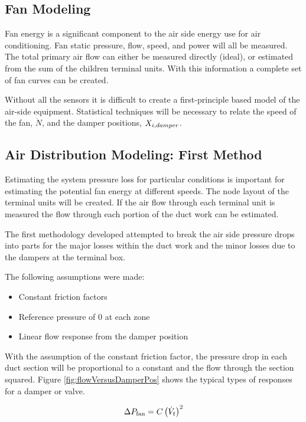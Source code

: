 \subsection{Fan Modeling}\label{sec:FanModeling}

Fan energy is a significant component to the air side energy use for air conditioning. Fan static pressure, flow, speed, and power will all be measured. The total primary air flow can either be measured directly (ideal), or estimated from the sum of the children terminal units. With this information a complete set of fan curves can be created. 

Without all the sensors it is difficult to create a first-principle based model of the air-side equipment. Statistical techniques will be necessary to relate the speed of the fan, \(\dot N\), and the damper positions, \(X_{i,damper}\). 

\subsection{Air Distribution Modeling: First Method}

Estimating the system pressure loss for particular conditions is important for estimating the potential fan energy at different speeds. The node layout of the terminal units will be created. If the air flow through each terminal unit is measured the flow through each portion of the duct work can be estimated. 

The first methodology developed attempted to break the air side pressure drops into parts for the major losses within the duct work and the minor losses due to the dampers at the terminal box. 

The following assumptions were made:

\begin{itemize}
    \item Constant friction factors
    \item Reference pressure of 0 at each zone
    \item Linear flow response from the damper position
\end{itemize}

With the assumption of the constant friction factor, the pressure drop in each duct section will be proportional to a constant and the flow through the section squared. Figure \ref{fig:flowVersusDamperPos} shows the typical types of responses for a damper or valve.

\begin{equation}\label{eq:PressureDrop}
    \Delta P_{\text{fan}} = C\left(\dot{V}_{t}\right)^2
\end{equation}

